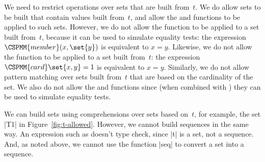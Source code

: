 We  need to restrict operations over sets that are built from~$t$.  We
do allow sets to be built that contain values built from~$t$, and allow the
 and  functions to be applied to such sets.  However,
we do not allow the function  to be applied to a set built
from~$t$, because it can be used to simulate equality tests: the expression
$\CSPMM{member}(x, \set{y})$ is equivalent to $x = y$.  Likewise, we do not
allow the function  to be applied to a set built from~$t$: the
expression $\CSPMM{card} \set{x,y} = 1$ is equivalent to $x = y$.  Similarly,
we do not allow pattern matching over sets built from~$t$ that are based on
the cardinality of the set.  We also do not allow the  and
 functions since (when combined with ) they can be used
to simulate equality tests.

We can build sets using comprehensions over sets based on~$t$, for example,
the set |T1| in Figure~\ref{fig:t-allowed}.  However, we cannot build
sequences in the same way.  An expression such as 
doesn't type check, since |t| is a set, not a sequence.  And, as noted above,
we cannot use the function |seq| to convert a set into a sequence.  




%


